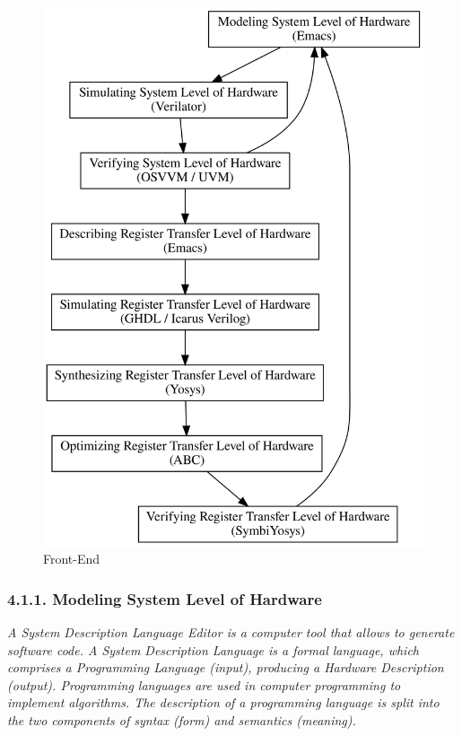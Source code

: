 \documentclass[
]{article}
\begin{document}
\begin{figure}
\centering
\includegraphics{../doc/front-end.svg}
\caption{Front-End}
\end{figure}

\hypertarget{modeling-system-level-of-hardware}{%
\subsubsection{4.1.1. Modeling System Level of
Hardware}\label{modeling-system-level-of-hardware}}

\emph{A System Description Language Editor is a computer tool that
allows to generate software code. A System Description Language is a
formal language, which comprises a Programming Language (input),
producing a Hardware Description (output). Programming languages are
used in computer programming to implement algorithms. The description of
a programming language is split into the two components of syntax (form)
and semantics (meaning).}
\end{document}
